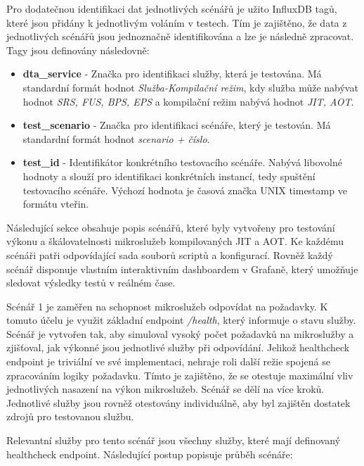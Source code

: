 Pro dodatečnou identifikaci dat jednotlivých scénářů je užito InfluxDB tagů, které jsou přidány k jednotlivým voláním v testech. Tím je zajištěno, že data z jednotlivých scénářů jsou jednoznačně identifikována a lze je následně zpracovat. Tagy jsou definovány následovně:

\begin{itemize}
    \item \textbf{dta\_service} - Značka pro identifikaci služby, která je testována. Má standardní formát hodnot \emph{Služba-Kompilační režim}, kdy služba může nabývat hodnot \emph{SRS, FUS, BPS, EPS} a kompilační režim nabývá hodnot \emph{JIT, AOT}.
    \item \textbf{test\_scenario} - Značka pro identifikaci scénáře, který je testován. Má standardní formát hodnot \emph{scenario 
    + číslo}.
    \item \textbf{test\_id} - Identifikátor konkrétního testovacího scénáře. Nabývá libovolné hodnoty a slouží pro identifikaci konkrétních instancí, tedy spuštění testovacího scénáře. Výchozí hodnota je časová značka UNIX timestamp ve formátu vteřin.
\end{itemize}


Následující sekce obsahuje popis scénářů, které byly vytvořeny pro testování výkonu a škálovatelnosti mikroslužeb kompilovaných JIT a AOT. Ke každému scénáři patři odpovídající sada souborů scriptů a konfigurací. Rovněž každý scénář disponuje vlastním interaktivním dashboardem v Grafaně, který umožňuje sledovat výsledky testů v reálném čase.


Scénář 1 je zaměřen na schopnost mikroslužeb odpovídat na požadavky. K tomuto účelu je využit základní endpoint \emph{/health}, který informuje o stavu služby. Scénář je vytvořen tak, aby simuloval vysoký počet požadavků na mikroslužby a zjišťoval, jak výkonné jsou jednotlivé služby při odpovídání. Jelikož healthcheck endpoint je triviální ve své implementaci, nehraje roli další režie spojená se zpracováním logiky požadavku. Tímto je zajištěno, že se otestuje maximální vliv jednotlivých nasazení na výkon mikroslužeb. Scénář se dělí na více kroků. Jednotlivé služby jsou rovněž otestovány individuálně, aby byl zajištěn dostatek zdrojů pro testovanou službu.


Relevantní služby pro tento scénář jsou všechny služby, které mají definovaný healthcheck endpoint. Následující postup popisuje průběh scénáře:

